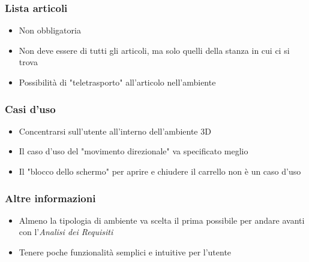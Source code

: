 \subsubsection{Lista articoli}
\begin{itemize}
    \item Non obbligatoria
    \item Non deve essere di tutti gli articoli, ma solo quelli della stanza in cui ci si trova
    \item Possibilità di "teletrasporto" all'articolo nell'ambiente
\end{itemize}
\subsubsection{Casi d'uso}
\begin{itemize}
    \item Concentrarsi sull'utente all'interno dell'ambiente 3D 
    \item Il caso d'uso del "movimento direzionale" va specificato meglio 
    \item Il "blocco dello schermo" per aprire e chiudere il carrello non 
            è un caso d'uso
\end{itemize}
\subsubsection{Altre informazioni}
\begin{itemize}
    \item Almeno la tipologia di ambiente va scelta il prima possibile per andare avanti con 
            l'\textit{Analisi dei Requisiti}
    \item Tenere poche funzionalità semplici e intuitive per l'utente
\end{itemize}